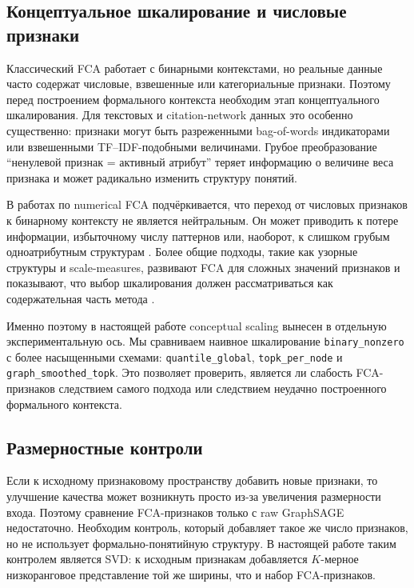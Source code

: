 \documentclass[14pt,a4paper]{extarticle}
\begin{document}
\subsection{Концептуальное шкалирование и числовые признаки}

Классический FCA работает с бинарными контекстами, но реальные данные часто
содержат числовые, взвешенные или категориальные признаки. Поэтому перед
построением формального контекста необходим этап концептуального шкалирования.
Для текстовых и citation-network данных это особенно существенно: признаки могут
быть разреженными bag-of-words индикаторами или взвешенными TF--IDF-подобными
величинами. Грубое преобразование ``ненулевой признак = активный атрибут''
теряет информацию о величине веса признака и может радикально изменить структуру
понятий.

В работах по numerical FCA подчёркивается, что переход от числовых признаков к
бинарному контексту не является нейтральным. Он может приводить к потере
информации, избыточному числу паттернов или, наоборот, к слишком грубым
одноатрибутным структурам \cite{kaytoue2011numericalfca}. Более общие подходы,
такие как узорные структуры и scale-measures, развивают FCA для сложных
значений признаков и показывают, что выбор шкалирования должен рассматриваться
как содержательная часть метода \cite{gnedo1991patternstructures,hanika2021scalemeasures}.

Именно поэтому в настоящей работе conceptual scaling вынесен в отдельную
экспериментальную ось. Мы сравниваем наивное шкалирование
\texttt{binary\_nonzero} с более насыщенными схемами: \texttt{quantile\_global},
\texttt{topk\_per\_node} и \texttt{graph\_smoothed\_topk}. Это позволяет
проверить, является ли слабость FCA-признаков следствием самого подхода или
следствием неудачно построенного формального контекста.

\subsection{Размерностные контроли}

Если к исходному признаковому пространству добавить новые признаки, то улучшение
качества может возникнуть просто из-за увеличения размерности входа. Поэтому
сравнение FCA-признаков только с raw GraphSAGE недостаточно. Необходим контроль,
который добавляет такое же число признаков, но не использует формально-понятийную
структуру. В настоящей работе таким контролем является SVD: к исходным признакам
добавляется $K$-мерное низкоранговое представление той же ширины, что и набор
FCA-признаков.
\end{document}
